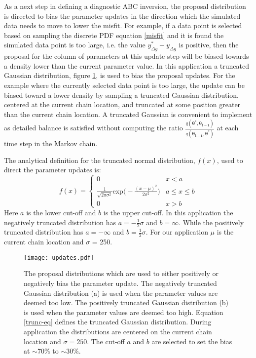 As a next step in defining a diagnostic ABC inversion, the proposal distribution is directed to bias the parameter updates in the direction which the simulated data needs to move to lower the misfit. For example, if a data point is selected based on sampling the discrete PDF equation \ref{misfit} and it is found the simulated data point is too large, i.e. the value $y^*_{\Delta g} - y_{\Delta g}$ is positive, then the proposal for the column of parameters at this update step will be biased towards a density lower than the current parameter value. In this application a truncated Gaussian distribution, figure \ref{updates}, is used to bias the proposal updates. For the example where the currently selected data point is too large, the update can be biased toward a lower density by sampling a truncated Gaussian distribution, centered at the current chain location, and truncated at some position greater than the current chain location. A truncated Gaussian is convenient to implement as detailed balance is satisfied without computing the ratio $\frac{q(\bm{\theta^*},\bm{\theta_{t-1}})}{q(\bm{\theta_{t-1}},\bm{\theta^*})}$ at each time step in the Markov chain. \par

The analytical definition for the truncated normal distribution, $f(x)$, used to direct the parameter updates is:
\begin{equation}
f(x) = \begin{cases} 
0 & x < a \\
\frac{1}{\sqrt{2\pi\sigma^2}}\text{exp}\Big(-\frac{(x-\mu)^2}{2\sigma^2}\Big) & a\leq x\leq b \\
0 & x > b 
\end{cases}
\label{trunc-eq}
\end{equation}
Here $a$ is the lower cut-off and $b$ is the upper cut-off. In this application the negatively truncated distribution has $a = -\frac{1}{2}\sigma$ and $b = \infty$. While the positively truncated distribution has $a = -\infty$ and $b = \frac{1}{2}\sigma$. For our application $\mu$ is the current chain location and $\sigma$ = 250. \par

\begin{figure}[H]
	\centering
	\texttt{[image: updates.pdf]}
	\caption{The proposal distributions which are used to either positively or negatively bias the parameter update. The negatively truncated Gaussian distribution (a) is used when the parameter values are deemed too low. The positively truncated Gaussian distribution (b) is used when the parameter values are deemed too high. Equation \ref{trunc-eq} defines the truncated Gaussian distribution. During application the distributions are centered on the current chain location and $\sigma = 250$. The cut-off $a$ and $b$ are selected to set the bias at $\sim$70\% to $\sim$30\%.} 
	\label{updates}
\end{figure}


